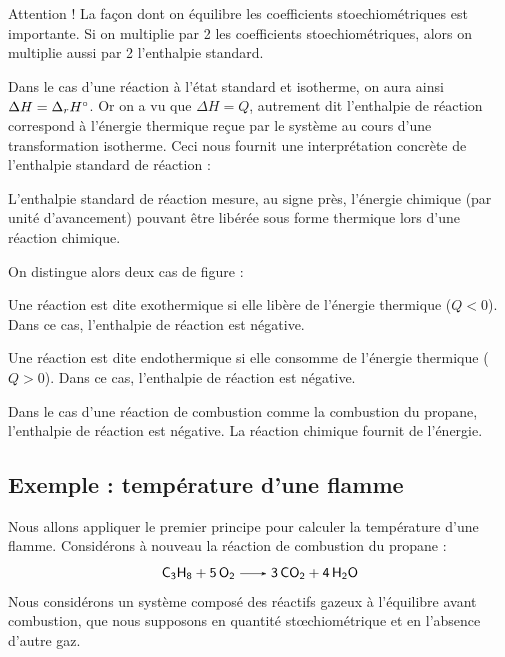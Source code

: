 \documentclass[11pt,fleqn]{book} %
\begin{document}
\begin{remark}
    Attention ! La façon dont on équilibre les coefficients stoechiométriques est importante. Si on multiplie par 2 les coefficients stoechiométriques, alors on multiplie aussi par 2 l'enthalpie standard. 
\end{remark}

Dans le cas d'une réaction à l'état standard et isotherme, on aura ainsi $\Delta H = \Delta_r H \degree$. Or on a vu que $\Delta H = Q$, autrement dit l'enthalpie de réaction correspond à l'énergie thermique reçue par le système au cours d'une transformation isotherme. Ceci nous fournit une interprétation concrète de l'enthalpie standard de réaction : 
\begin{proposition}
    L'enthalpie standard de réaction mesure, au signe près, l'énergie chimique (par unité d'avancement) pouvant être libérée sous forme thermique lors d'une réaction chimique.
\end{proposition}

On distingue alors deux cas de figure :
\begin{definition}
    Une réaction est dite exothermique si elle libère de l'énergie thermique ($Q<0$). Dans ce cas, l'enthalpie de réaction est négative.
\end{definition}
\begin{definition}
    Une réaction est dite endothermique si elle consomme de l'énergie thermique ($Q>0$). Dans ce cas, l'enthalpie de réaction est négative.
\end{definition}

\begin{example}
    Dans le cas d'une réaction de combustion comme la combustion du propane, l'enthalpie de réaction est négative. La réaction chimique fournit de l'énergie.
\end{example}

\subsection*{Exemple : température d'une flamme}

Nous allons appliquer le premier principe pour calculer la température d'une flamme. Considérons à nouveau la réaction de combustion du propane :
\begin{equation}
    \ce{C3H8 + 5 O2 -> 3 CO2 + 4 H2O}
\end{equation}
Nous considérons un système composé des réactifs gazeux à l'équilibre avant combustion, que nous supposons en quantité stœchiométrique et en l'absence d'autre gaz. 
\end{document}
